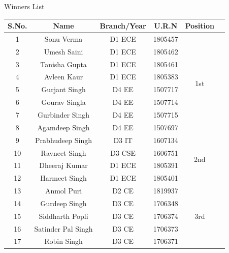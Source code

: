 \documentclass[12pt, a4 paper]{article}
\begin{document}
\newpage

\begin{center}
\huge Winners List
\end{center}

\begin{table}[h!]
  \begin{center}
    \begin{tabular}{|c|c|c|c|c|c|} 
    \toprule %
      \textbf{S.No.} & \textbf{Name} & \textbf{Branch/Year} & \textbf{U.R.N} &\textbf{Position} \\
      \midrule %
       	1  & Sonu Verma	        & D1 ECE & 1805457 & \multirow{8}{*}{1st} \\
        2  & Umesh Saini	    & D1 ECE & 1805462 & \\
        3  & Tanisha Gupta	    & D1 ECE & 1805461 & \\
        4  & Avleen Kaur	    & D1 ECE & 1805383 & \\
        5  & Gurjant Singh	    & D4 EE	 & 1507717 & \\
        6  & Gourav Singla	    & D4 EE	 & 1507714 & \\
        7  & Gurbinder Singh	& D4 EE	 & 1507715 & \\
        8  & Agamdeep Singh	    & D4 EE	 & 1507697 & \\
        9  & Prabhudeep Singh	& D3 IT	 & 1607134 & \multirow{4}{*}{2nd} \\
        \hline
	    10 & Ravneet Singh	    & D3 CSE & 1606751 & \\
	    11 & Dheeraj Kumar	    & D1 ECE & 1805391 & \\
	    12 & Harmeet Singh	    & D1 ECE & 1805401 & \\
	    13 & Anmol Puri	        & D2 CE	 & 1819937 & \multirow{5}{*}{3rd} \\
	    \hline
		14 & Gurdeep Singh	    & D3 CE	 & 1706348 & \\
		15 & Siddharth Popli	& D3 CE	 & 1706374 & \\
		16 & Satinder Pal Singh & D3 CE	 & 1706373 & \\
		17 & Robin Singh	    & D3 CE	 & 1706371 & \\

      \bottomrule %
    \end{tabular}
  \end{center}
\end{table}
\end{document}
